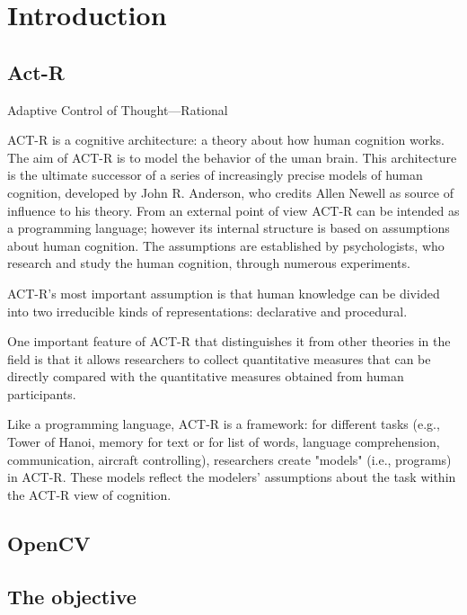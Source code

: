 \chapter{Introduction}
\section{Act-R}
Adaptive Control of Thought—Rational

ACT-R is a cognitive architecture: a theory about how human cognition works. The aim of ACT-R is to model the behavior of the uman brain. This architecture is the ultimate successor of a series of increasingly precise models of human cognition, developed by John R. Anderson, who credits Allen Newell as source of influence to his theory.
From an external point of view ACT-R can be intended as a programming language; however its internal structure is based on assumptions about human cognition. The assumptions are established by psychologists, who research and study the human cognition, through numerous experiments. ~\cite{Allen94}

ACT-R's most important assumption is that human knowledge can be divided into two irreducible kinds of representations: declarative and procedural.


One important feature of ACT-R that distinguishes it from other theories in the field is 
that it allows researchers to collect quantitative measures that can be directly compared 
with the quantitative measures obtained from human participants.

Like a programming language, ACT-R is a framework: for different tasks 
(e.g., Tower of Hanoi, memory for text or for list of words, language comprehension, 
communication, aircraft controlling), researchers create "models" (i.e., programs) in ACT-R. 
These models reflect the modelers' assumptions about the task within the ACT-R view of 
cognition.
\section{OpenCV}
\section{The objective}